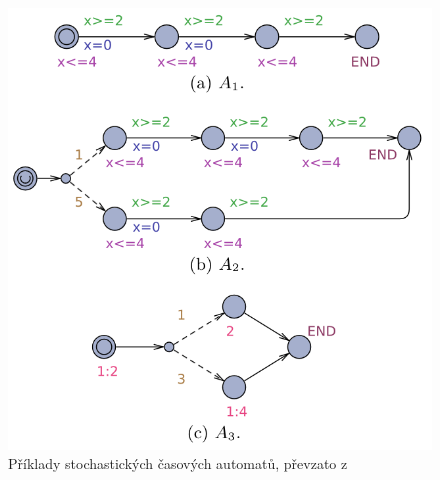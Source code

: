 \begin{figure}[H]
  \begin{minipage}[b]{.49\linewidth}
    \centering
    \includegraphics[width=\linewidth]{obrazky-figures/sta_examples.png}
    \caption{Příklady stochastických časových automatů, převzato z~\cite{uppaal_smc}}
    \label{fig:sta_examples}
  \end{minipage}
  \begin{minipage}[b]{.49\linewidth}
    \centering

\end{minipage}
\end{figure}
